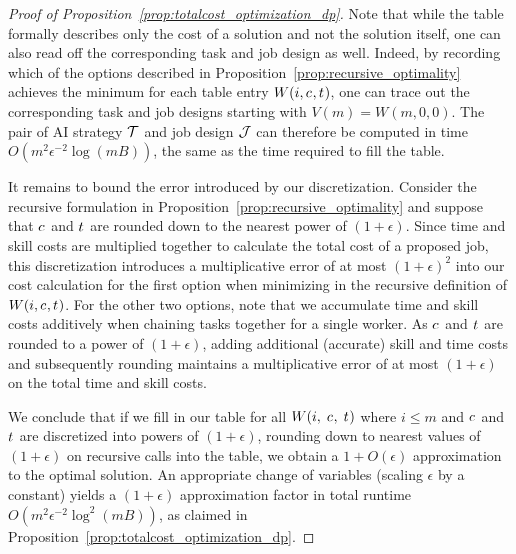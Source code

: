 \begin{proof}[Proof of Proposition~\ref{prop:totalcost_optimization_dp}]
Note that while the table formally describes only the cost of a solution and not the solution itself, one can also read off the corresponding task and job design as well.  
Indeed, by recording which of the options described in Proposition~\ref{prop:recursive_optimality} achieves the minimum for each table entry $W(i, c_{}, t_{})$, one can trace out the corresponding task and job designs starting with $V(m) = W(m, 0 , 0)$.  
The pair of AI strategy $\mathcal{T}$ and job design $\mathcal{J}$ can therefore be computed in time $O(m^2 \epsilon^{-2} \log(mB) )$, the same as the time required to fill the table.

It remains to bound the error introduced by our discretization.  
Consider the recursive formulation in Proposition~\ref{prop:recursive_optimality} and suppose that $c_{}$ and $t_{}$ are rounded down to the nearest power of $(1+\epsilon)$.  
Since time and skill costs are multiplied together to calculate the total cost of a proposed job, this discretization introduces a multiplicative error of at most $(1+\epsilon)^2$ into our cost calculation for the first option when minimizing in the recursive definition of $W(i, c_{}, t_{})$. 
For the other two options, note that we accumulate time and skill costs additively when chaining tasks together for a single worker.  
As $c_{}$ and $t_{}$ are rounded to a power of $(1+\epsilon)$, adding additional (accurate) skill and time costs and subsequently rounding maintains a multiplicative error of at most $(1+\epsilon)$ on the total time and skill costs.  

We conclude that if we fill in our table for all $W(i,\; c_{},\; t_{})$ where $i \leq m$ and $c_{}$ and $t_{}$ are discretized into powers of $(1+\epsilon)$, rounding down to nearest values of $(1+\epsilon)$ on recursive calls into the table, we obtain a $1 + O(\epsilon)$ approximation to the optimal solution.  
An appropriate change of variables (scaling $\epsilon$ by a constant) yields a $(1+\epsilon)$ approximation factor in total runtime $O(m^2 \epsilon^{-2} \log^2(mB))$, as claimed in Proposition~\ref{prop:totalcost_optimization_dp}.
\end{proof}